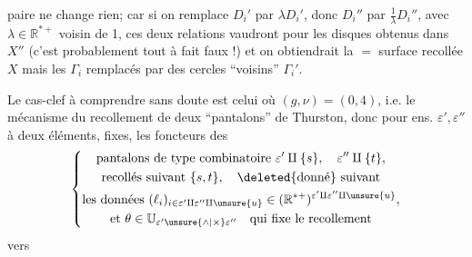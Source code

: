 paire ne change rien; car si on remplace
$D_i'$ par $\lambda D_i'$, donc $D_i''$ par $\frac1\lambda D_i''$, avec $\lambda\in\mathbb R^{*+}$
voisin de 1, ces deux relations vaudront
pour les disques obtenus dans  $X''$
(c'est probablement tout à fait faux !)
et on obtiendrait la $=$ surface recollée $X$
mais les $\Gamma_i$ remplacés par des cercles
``voisins'' $\Gamma_i'$.

Le cas-clef à comprendre sans
doute est celui où $(g,\nu)=(0,4)$,
i.e. le mécanisme du recollement
de deux ``pantalons'' de Thurston,
donc pour  ens. $\varepsilon',\varepsilon''$ à deux
éléments, fixes, les foncteurs des
\[
\left\{\begin{gathered}
\text{pantalons de type combinatoire }\varepsilon'\amalg\{s\},\quad\varepsilon''\amalg\{t\},\\
\text{recollés suivant }\{s,t\},\quad\deleted{\text{donné}}\ \text{suivant}\\
\text{les données }(\ell_i)_{i\in\varepsilon'\amalg\varepsilon''\amalg\unsure{u}}
\in(\mathbb R^{*+})^{\varepsilon'\amalg\varepsilon''\amalg\unsure{u}},\\
\text{et }\theta\in\mathbb U_{\varepsilon'\unsure{\wedge|\times}\varepsilon''}\quad\text{qui fixe le recollement}
\end{gathered}\right.
\]
vers
